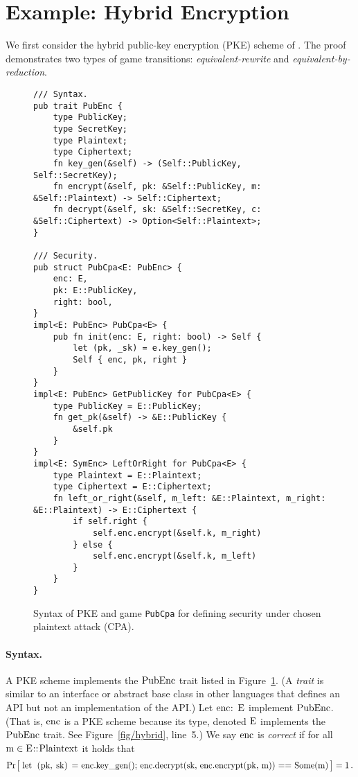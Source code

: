 \documentclass{article}
\newcommand{\Prob}[1]{\Pr\hspace{-1pt}\big[\,#1\,\big]}
\newcommand{\code}[1]{\textrm{\textup{\lstinline{#1}}}}
\begin{document}
\section{Example: Hybrid Encryption}\label{sec/hybrid}

We first consider the hybrid public-key encryption (PKE) scheme of
\cite[Chapter~15]{joy}.
%
The proof demonstrates two types of game transitions: \emph{equivalent-rewrite}
and \emph{equivalent-by-reduction}.


\begin{figure}[t]
\begin{lstlisting}
/// Syntax.
pub trait PubEnc {
    type PublicKey;
    type SecretKey;
    type Plaintext;
    type Ciphertext;
    fn key_gen(&self) -> (Self::PublicKey, Self::SecretKey);
    fn encrypt(&self, pk: &Self::PublicKey, m: &Self::Plaintext) -> Self::Ciphertext;
    fn decrypt(&self, sk: &Self::SecretKey, c: &Self::Ciphertext) -> Option<Self::Plaintext>;
}

/// Security.
pub struct PubCpa<E: PubEnc> {
    enc: E,
    pk: E::PublicKey,
    right: bool,
}
impl<E: PubEnc> PubCpa<E> {
    pub fn init(enc: E, right: bool) -> Self {
        let (pk, _sk) = e.key_gen();
        Self { enc, pk, right }
    }
}
impl<E: PubEnc> GetPublicKey for PubCpa<E> {
    type PublicKey = E::PublicKey;
    fn get_pk(&self) -> &E::PublicKey {
        &self.pk
    }
}
impl<E: SymEnc> LeftOrRight for PubCpa<E> {
    type Plaintext = E::Plaintext;
    type Ciphertext = E::Ciphertext;
    fn left_or_right(&self, m_left: &E::Plaintext, m_right: &E::Plaintext) -> E::Ciphertext {
        if self.right {
            self.enc.encrypt(&self.k, m_right)
        } else {
            self.enc.encrypt(&self.k, m_left)
        }
    }
}
\end{lstlisting}
  \caption{Syntax of PKE and game \lstinline{PubCpa}
  for defining security under chosen plaintext attack (CPA).}
  \label{fig/pubenc/security}
  \label{fig/pubenc/syntax}
\end{figure}


\paragraph{Syntax.}
%
A PKE scheme implements the $\code{PubEnc}$ trait listed in
Figure~\ref{fig/pubenc/syntax}.
%
(A \emph{trait} is similar to an interface or abstract base class in other
languages that defines an API but not an implementation of the API.)
%
Let $\code{enc: E}$ implement $\code{PubEnc}$.
%
(That is, $\code{enc}$ is a PKE scheme because its type, denoted $\code{E}$
implements the $\code{PubEnc}$ trait. See Figure~\ref{fig/hybrid}, line~5.)
%
We say $\code{enc}$ is \emph{correct} if for all $\code{m} \in
\code{E::Plaintext}$ it holds that
%
\[
  \Prob{
    \code{let (pk, sk) = enc.key_gen();
    enc.decrypt(sk, enc.encrypt(pk, m)) == Some(m)}
  } = 1 \,.
\]
\end{document}
